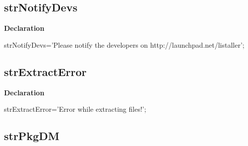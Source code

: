 \documentclass{report}
\newif\ifpdf
\begin{document}
\subsection*{strNotifyDevs}
\fi
\label{trstrings-strNotifyDevs}
\begin{list}{}{
\setlength{\itemindent}{0cm}
\setlength{\listparindent}{0cm}
\setlength{\leftmargin}{\evensidemargin}
\addtolength{\leftmargin}{\tmplength}
\settowidth{\labelsep}{X}
\addtolength{\leftmargin}{\labelsep}
\setlength{\labelwidth}{\tmplength}
}
\item[\textbf{Declaration}\hfill]
\ifpdf
\begin{flushleft}
\fi
\begin{ttfamily}
strNotifyDevs='Please notify the developers on http://launchpad.net/listaller';\end{ttfamily}

\ifpdf
\end{flushleft}
\fi

\end{list}
\ifpdf
\subsection*{\large{\textbf{strExtractError}}\normalsize\hspace{1ex}\hrulefill}
\else
\subsection*{strExtractError}
\fi
\label{trstrings-strExtractError}
\begin{list}{}{
\setlength{\itemindent}{0cm}
\setlength{\listparindent}{0cm}
\setlength{\leftmargin}{\evensidemargin}
\addtolength{\leftmargin}{\tmplength}
\settowidth{\labelsep}{X}
\addtolength{\leftmargin}{\labelsep}
\setlength{\labelwidth}{\tmplength}
}
\item[\textbf{Declaration}\hfill]
\ifpdf
\begin{flushleft}
\fi
\begin{ttfamily}
strExtractError='Error while extracting files!';\end{ttfamily}

\ifpdf
\end{flushleft}
\fi

\end{list}
\ifpdf
\subsection*{\large{\textbf{strPkgDM}}\normalsize\hspace{1ex}\hrulefill}
\else
\end{document}

